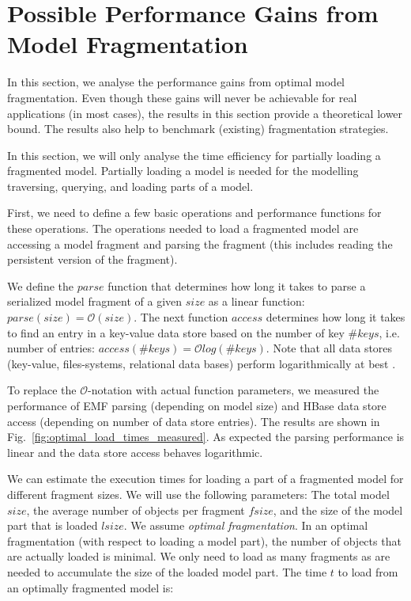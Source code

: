 \section{Possible Performance Gains from Model Fragmentation}

In this section, we analyse the performance gains from optimal model fragmentation. Even though these gains will never be achievable for real applications (in most cases), the results in this section provide a theoretical lower bound. The results also help to benchmark (existing) fragmentation strategies. 

In this section, we will only analyse the time efficiency for partially loading a fragmented model. Partially loading a model is needed for the modelling traversing, querying, and loading parts of a model.

First, we need to define a few basic operations and performance functions for these operations. The operations needed to load a fragmented model are accessing a model fragment and parsing the fragment (this includes reading the persistent version of the fragment). 

We define the $parse$ function that determines how long it takes to parse a serialized model fragment of a given $size$ as a linear function: $parse(size)=\mathcal{O}\left(size\right)$. The next function $access$ determines how long it takes to find an entry in a key-value data store based on the number of key $\#keys$, i.e. number of entries: $access(\#keys)=\mathcal{O}log(\#keys)$.
Note that all data stores (key-value, files-systems, relational data bases) perform logarithmically at best .

To replace the $\mathcal{O}$-notation with actual function parameters, we measured the performance of EMF parsing (depending on model size) and HBase data store access (depending on number of data store entries). The results are shown in Fig.~\ref{fig:optimal_load_times_measured}. As expected the parsing performance is linear and the data store access behaves logarithmic. 

We can estimate the execution times for loading a part of a fragmented model for different fragment sizes. We will use the following parameters: The total model $size$, the average number of objects per fragment $fsize$, and the size of the model part that is loaded $lsize$. We assume \emph{optimal fragmentation}. In an optimal fragmentation (with respect to loading a model part), the number of objects that are actually loaded is minimal. We only need to load as many fragments as are needed to accumulate the size of the loaded model part. The time $t$ to load from an optimally fragmented model is:

